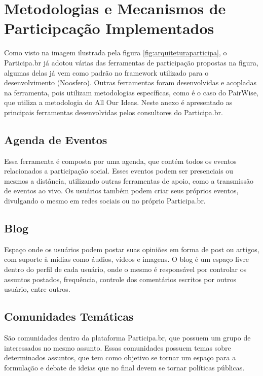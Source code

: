 \newpage
\appendix
\section{Metodologias e Mecanismos de Participcação Implementados}
\label{Att:ferramentasparticipacao}

Como visto na imagem ilustrada pela figura \ref{fig:arquiteturaparticipa}, o Participa.br já adotou várias das ferramentas de participação propostas na figura, algumas delas já vem como padrão no framework utilizado para o desenvolvimento (Noosfero). Outras ferramentas foram desenvolvidas e acopladas na ferramenta, pois utilizam metodologias específicas, como é o caso do PairWise, que utiliza a metodologia do All Our Ideas. Neste anexo é apresentado as principais ferramentas desenvolvidas pelos consultores do Participa.br.

\subsection*{Agenda de Eventos}

Essa ferramenta é composta por uma agenda, que contém todos os eventos relacionados a participação social. Esses eventos podem ser presenciais ou mesmos a distância, utilizando outras ferramentas de apoio, como a transmissão de eventos ao vivo. Os usuários também podem criar seus próprios eventos, divulgando o mesmo em redes sociais ou no próprio Participa.br.

\subsection*{Blog}

Espaço onde os usuários podem postar suas opiniões em forma de post ou artigos, com suporte à mídias como áudios, vídeos e imagens. O blog é um espaço livre dentro do perfil de cada usuário, onde o mesmo é responsável por controlar os assuntos postados, frequência, controle dos comentários escritos por outros usuário, entre outros.

\subsection*{Comunidades Temáticas}

São comunidades dentro da plataforma Participa.br, que possuem um grupo de interessados no mesmo assunto. Essas comunidades possuem temas sobre determinados assuntos, que tem como objetivo se tornar um espaço para a formulação e debate de ideias que no final devem se tornar políticas públicas.

